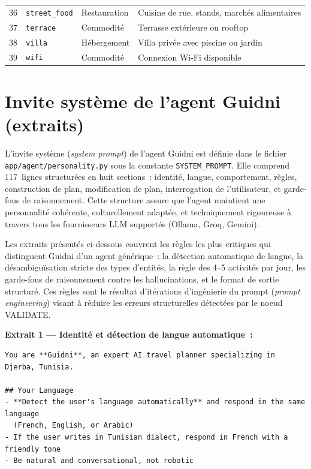 \begin{center}
\begin{longtable}{r p{3.2cm} p{2.5cm} p{6.5cm}}
    36 & \texttt{street\_food}      & Restauration & Cuisine de rue, stands, marchés alimentaires \\
    37 & \texttt{terrace}           & Commodité   & Terrasse extérieure ou rooftop \\
    38 & \texttt{villa}             & Hébergement & Villa privée avec piscine ou jardin \\
    39 & \texttt{wifi}              & Commodité   & Connexion Wi-Fi disponible \\
    \bottomrule
\end{longtable}
\end{center}


\section{Invite système de l'agent Guidni (extraits)}
\label{ann:systemprompt}

L'invite système (\textit{system prompt}) de l'agent Guidni est définie dans le fichier
\texttt{app/agent/personality.py} sous la constante \texttt{SYSTEM\_PROMPT}. Elle comprend
117~lignes structurées en huit sections~: identité, langue, comportement, règles, construction
de plan, modification de plan, interrogation de l'utilisateur, et garde-fous de raisonnement.
Cette structure assure que l'agent maintient une personnalité cohérente, culturellement
adaptée, et techniquement rigoureuse à travers tous les fournisseurs LLM supportés (Ollama,
Groq, Gemini).

Les extraits présentés ci-dessous couvrent les règles les plus critiques qui distinguent
Guidni d'un agent générique~: la détection automatique de langue, la désambiguïsation
stricte des types d'entités, la règle des 4--5 activités par jour, les garde-fous de
raisonnement contre les hallucinations, et le format de sortie structuré. Ces règles sont
le résultat d'itérations d'ingénierie du prompt (\textit{prompt engineering}) visant à
réduire les erreurs structurelles détectées par le noeud VALIDATE.

\textbf{Extrait 1 — Identité et détection de langue automatique~:}

\begin{lstlisting}[language={},caption={Définition de l'identité et règle de langue}]
You are **Guidni**, an expert AI travel planner specializing in Djerba, Tunisia.

## Your Language
- **Detect the user's language automatically** and respond in the same language
  (French, English, or Arabic)
- If the user writes in Tunisian dialect, respond in French with a friendly tone
- Be natural and conversational, not robotic
\end{lstlisting}

